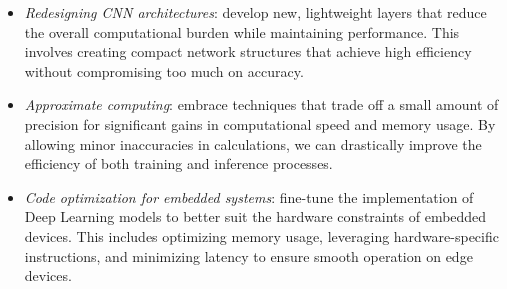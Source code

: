 \begin{itemize} 
    \item \textit{Redesigning CNN architectures}: develop new, lightweight layers that reduce the overall computational burden while maintaining performance. 
        This involves creating compact network structures that achieve high efficiency without compromising too much on accuracy.
    \item \textit{Approximate computing}: embrace techniques that trade off a small amount of precision for significant gains in computational speed and memory usage. 
        By allowing minor inaccuracies in calculations, we can drastically improve the efficiency of both training and inference processes.  
    \item \textit{Code optimization for embedded systems}: fine-tune the implementation of Deep Learning models to better suit the hardware constraints of embedded devices. 
        This includes optimizing memory usage, leveraging hardware-specific instructions, and minimizing latency to ensure smooth operation on edge devices.
\end{itemize}